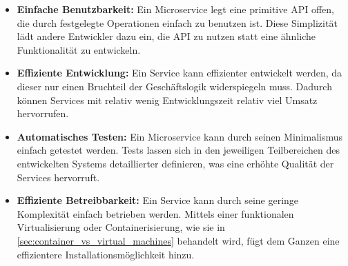 \begin{itemize}
      \item \textbf{Einfache Benutzbarkeit:} Ein Microservice legt eine primitive API offen, die durch festgelegte Operationen einfach zu benutzen ist. Diese Simplizität lädt andere Entwickler dazu ein, die API zu nutzen statt eine ähnliche Funktionalität zu entwickeln.
      
      \item \textbf{Effiziente Entwicklung:} Ein Service kann effizienter entwickelt werden, da dieser nur einen Bruchteil der Geschäftslogik widerspiegeln muss. Dadurch können Services mit relativ wenig Entwicklungszeit relativ viel Umsatz hervorrufen.
      
      \item \textbf{Automatisches Testen:} Ein Microservice kann durch seinen Minimalismus einfach getestet werden. Tests lassen sich in den jeweiligen Teilbereichen des entwickelten Systems detaillierter definieren, was eine erhöhte Qualität der Services hervorruft.
      
      \item \textbf{Effiziente Betreibbarkeit:} Ein Service kann durch seine geringe Komplexität einfach betrieben werden. Mittels einer funktionalen Virtualisierung oder Containerisierung, wie sie in \autoref{sec:container_vs_virtual_machines} behandelt wird, fügt dem Ganzen eine effizientere Installationsmöglichkeit hinzu.
    \end{itemize}
    \parencites[S. 21--22]{takai2017architektur}{newman2015buildingmicroservices}{allspaw2010web}[S. 23--25]{gallipeau2018microservices}
    \clearpage

